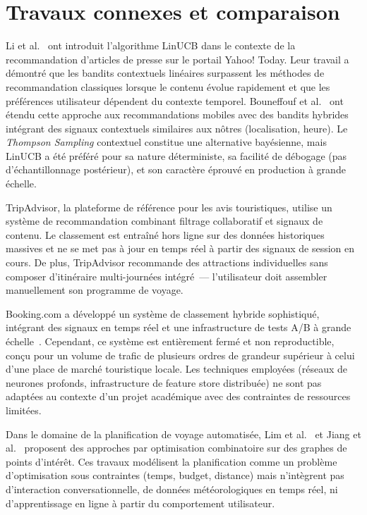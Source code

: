 \section{Travaux connexes et comparaison}

Li et al.~\cite{li2010linucb} ont introduit l'algorithme LinUCB dans le contexte de la
recommandation d'articles de presse sur le portail Yahoo! Today. Leur travail a démontré que
les bandits contextuels linéaires surpassent les méthodes de recommandation classiques lorsque
le contenu évolue rapidement et que les préférences utilisateur dépendent du contexte temporel.
Bouneffouf et al.~\cite{bouneffouf2014context} ont étendu cette approche aux recommandations
mobiles avec des bandits hybrides intégrant des signaux contextuels similaires aux nôtres
(localisation, heure). Le \textit{Thompson Sampling} contextuel constitue une alternative
bayésienne, mais LinUCB a été préféré pour sa nature déterministe, sa facilité de débogage
(pas d'échantillonnage postérieur), et son caractère éprouvé en production à grande échelle.

TripAdvisor, la plateforme de référence pour les avis touristiques, utilise un système de
recommandation combinant filtrage collaboratif et signaux de contenu. Le classement est entraîné
hors ligne sur des données historiques massives et ne se met pas à jour en temps réel à partir
des signaux de session en cours. De plus, TripAdvisor recommande des attractions individuelles
sans composer d'itinéraire multi-journées intégré~--- l'utilisateur doit assembler manuellement
son programme de voyage.

Booking.com a développé un système de classement hybride sophistiqué, intégrant des signaux
en temps réel et une infrastructure de tests A/B à grande échelle~\cite{bernardi2019booking}.
Cependant, ce système est entièrement fermé et non reproductible, conçu pour un volume de
trafic de plusieurs ordres de grandeur supérieur à celui d'une place de marché touristique
locale. Les techniques employées (réseaux de neurones profonds, infrastructure de feature store
distribuée) ne sont pas adaptées au contexte d'un projet académique avec des contraintes de
ressources limitées.

Dans le domaine de la planification de voyage automatisée, Lim et al.~\cite{lim2018personalized}
et Jiang et al.~\cite{jiang2019trip} proposent des approches par optimisation combinatoire
sur des graphes de points d'intérêt. Ces travaux modélisent la planification comme un problème
d'optimisation sous contraintes (temps, budget, distance) mais n'intègrent pas d'interaction
conversationnelle, de données météorologiques en temps réel, ni d'apprentissage en ligne à
partir du comportement utilisateur.

